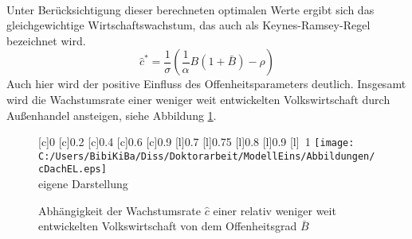 \\
Unter Berücksichtigung dieser berechneten optimalen Werte ergibt sich das gleichgewichtige Wirtschaftswachstum, das auch als Keynes-Ramsey-Regel bezeichnet wird. 
\begin{equation}
\boxed{\hat{c}^*=\frac{1}{\sigma}\left(\frac{1}{\alpha} B(1+\bar{B})-\rho\right)}
\end{equation}
Auch hier wird der positive Einfluss des Offenheitsparameters deutlich. Insgesamt wird die Wachstumsrate einer weniger weit entwickelten Volkswirtschaft durch Au{\ss}enhandel ansteigen, siehe Abbildung \ref{fig:cDachEL}.  
\begin{figure}[htb] 
\vspace{0.23cm}
 \centering 
		[c]{\footnotesize{0}}
		[c]{\footnotesize{0.2}}
		[c]{\footnotesize{0.4}}
		[c]{\footnotesize{0.6}}
		[c]{\footnotesize{0.9}}
		[l]{\footnotesize{0.7}}
		[l]{\footnotesize{0.75}}
		[l]{\footnotesize{0.8}}
		[l]{\footnotesize{0.9}}
		[l]{~\footnotesize{1}}
\texttt{[image: C:/Users/BibiKiBa/Diss/Doktorarbeit/ModellEins/Abbildungen/cDachEL.eps]}
\\
\hfill\footnotesize{}  eigene Darstellung
	\caption{Abhängigkeit der Wachstumsrate $\hat{c}$ einer relativ weniger weit entwickelten Volkswirtschaft von dem Offenheitsgrad $\bar{B}$}
	\label{fig:cDachEL}
\end{figure}

\FloatBarrier
